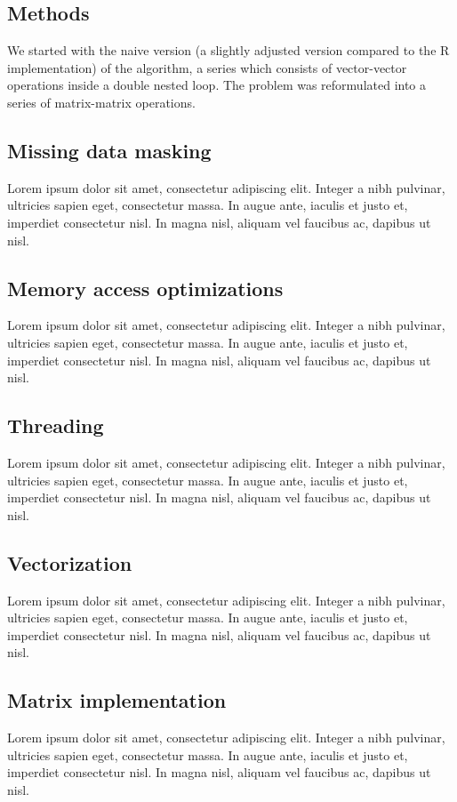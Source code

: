 \documentclass{bioinfo}
\begin{document}
\begin{methods}
\section{Methods}

We started with the naive version (a slightly adjusted version compared to the R 
implementation) of the algorithm, a series which consists of vector-vector 
operations inside a double nested loop. The problem was reformulated into a 
series of matrix-matrix operations.

\subsection{Missing data masking}
Lorem ipsum dolor sit amet, consectetur adipiscing elit. Integer a 
nibh pulvinar, ultricies sapien eget, consectetur massa. In augue 
ante, iaculis et justo et, imperdiet consectetur nisl. In magna 
nisl, aliquam vel faucibus ac, dapibus ut nisl. 

\subsection{Memory access optimizations}
Lorem ipsum dolor sit amet, consectetur adipiscing elit. Integer a 
nibh pulvinar, ultricies sapien eget, consectetur massa. In augue 
ante, iaculis et justo et, imperdiet consectetur nisl. In magna 
nisl, aliquam vel faucibus ac, dapibus ut nisl. 

\subsection{Threading}
Lorem ipsum dolor sit amet, consectetur adipiscing elit. Integer a 
nibh pulvinar, ultricies sapien eget, consectetur massa. In augue 
ante, iaculis et justo et, imperdiet consectetur nisl. In magna 
nisl, aliquam vel faucibus ac, dapibus ut nisl. 

\subsection{Vectorization}
Lorem ipsum dolor sit amet, consectetur adipiscing elit. Integer a 
nibh pulvinar, ultricies sapien eget, consectetur massa. In augue 
ante, iaculis et justo et, imperdiet consectetur nisl. In magna 
nisl, aliquam vel faucibus ac, dapibus ut nisl. 

\subsection{Matrix implementation}
Lorem ipsum dolor sit amet, consectetur adipiscing elit. Integer a 
nibh pulvinar, ultricies sapien eget, consectetur massa. In augue 
ante, iaculis et justo et, imperdiet consectetur nisl. In magna 
nisl, aliquam vel faucibus ac, dapibus ut nisl. 


\end{methods}
\end{document}
